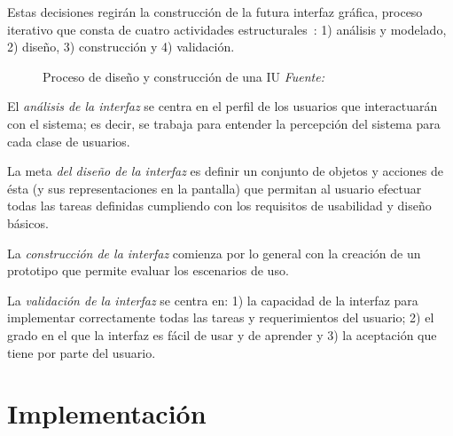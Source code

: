 Estas decisiones regirán la construcción de la futura interfaz gráfica, proceso iterativo que consta de cuatro actividades estructurales~\cite{Man97}: 1) análisis y modelado, 2) diseño, 3) construcción y 4) validación.

\begin{figure} [!htb]
	\centering
	\caption[Proceso de diseño y construcción de una IU]{Proceso de diseño y construcción de una IU \textit{Fuente:~\cite{Pre10}}}
	\label{fig:disenoIU}
\end{figure}

El \emph{análisis de la interfaz} se centra en el perfil de los usuarios que interactuarán con el sistema; es decir, se trabaja para entender la percepción del sistema para cada clase de usuarios.

La meta \emph{del diseño de la interfaz} es definir un conjunto de objetos y acciones de ésta (y sus representaciones en la pantalla) que permitan al usuario efectuar todas las tareas definidas cumpliendo con los requisitos de usabilidad y diseño básicos.

La \emph{construcción de la interfaz} comienza por lo general con la creación de un prototipo que
permite evaluar los escenarios de uso.

La \emph{validación de la interfaz} se centra en: 1) la capacidad de la interfaz para implementar
correctamente todas las tareas y requerimientos del usuario; 2) el grado en el que la interfaz es fácil de usar y de aprender y 3) la aceptación que tiene por parte del usuario.



\section{Implementación}
\label{sec:secModeloImp}

